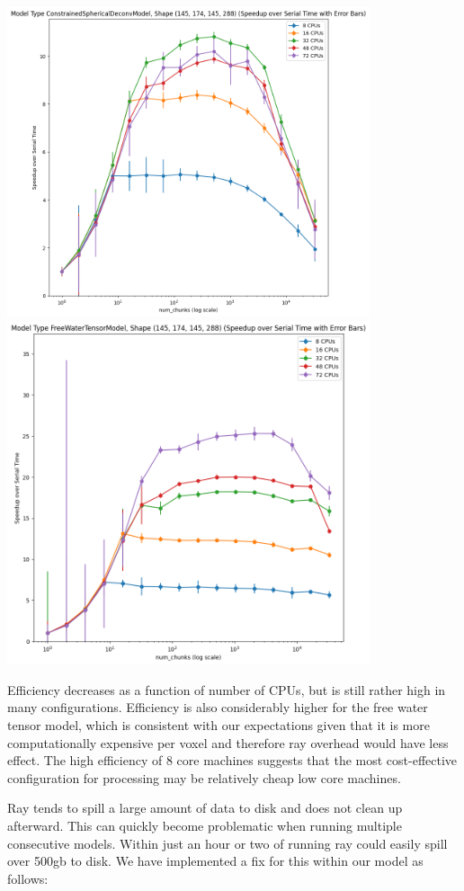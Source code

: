 \documentclass[
  letterpaper,
  DIV=11,
  numbers=noendperiod]{scrartcl}
\begin{document}
\includegraphics[width=0.8\textwidth,height=0.8\textheight]{figures/csdm_speedup.png}
\includegraphics[width=0.8\textwidth,height=0.8\textheight]{figures/fwdtim_speedup.png}

Efficiency decreases as a function of number of CPUs, but is still
rather high in many configurations. Efficiency is also considerably
higher for the free water tensor model, which is consistent with our
expectations given that it is more computationally expensive per voxel
and therefore ray overhead would have less effect. The high efficiency
of 8 core machines suggests that the most cost-effective configuration
for processing may be relatively cheap low core machines.

Ray tends to spill a large amount of data to disk and does not clean up
afterward. This can quickly become problematic when running multiple
consecutive models. Within just an hour or two of running ray could
easily spill over 500gb to disk. We have implemented a fix for this
within our model as follows:
\end{document}
